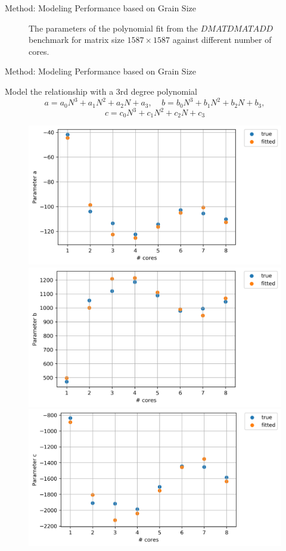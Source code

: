 \documentclass[10pt]{beamer}
\begin{document}
\begin{frame}{Method: Modeling Performance based on Grain Size}
\begin{outline}
\begin{figure}[H]
			\caption{The parameters of the polynomial fit from the $DMATDMATADD$ benchmark for matrix size $1587\times1587$ against different number of cores.}	
			\label{fig31}
		\end{figure}
	\end{outline}
\end{frame}

\begin{frame}{Method: Modeling Performance based on Grain Size}
	\begin{outline}			
		\1Model the relationship with a 3rd degree polynomial
		$$a=a_0N^3+a_1N^2+a_2N+a_3
		,\:\:\:\:\:b=b_0N^3+b_1N^2+b_2N+b_3,$$ $$c=c_0N^3+c_1N^2+c_2N+c_3$$
		\begin{figure}[H]
			\centering
			{\includegraphics[scale=.25]{images/polyfit/fig_690_params_0.png}\label{fig15:a}}
			{\includegraphics[scale=.25]{images/polyfit/fig_690_params_1.png}\label{fig15:b}}
			{\includegraphics[scale=.25]{images/polyfit/fig_690_params_2.png}\label{fig15:c}}

\end{figure}
\end{outline}
\end{frame}
\end{document}
